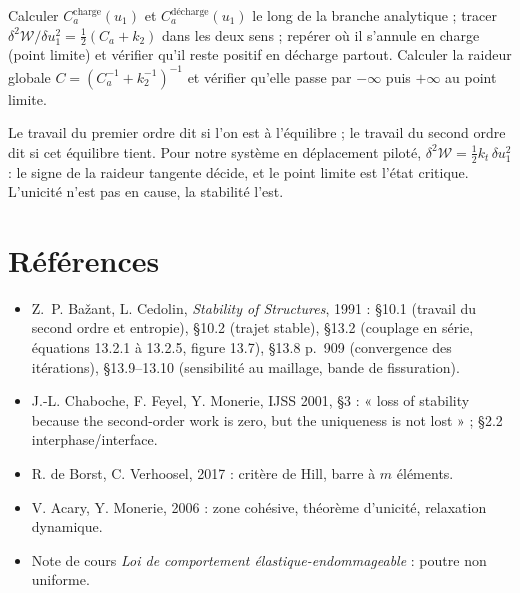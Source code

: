 \documentclass[11pt,a4paper]{article}
\newcommand{\dW}{\delta^2\mathcal W}
\begin{document}
\begin{alamain}
Calculer $C_a^{\text{charge}}(u_1)$ et $C_a^{\text{décharge}}(u_1)$ le long de la branche
analytique ; tracer $\dW/\delta u_1^2 = \tfrac12(C_a + k_2)$ dans les deux sens ; repérer où il
s'annule en charge (point limite) et vérifier qu'il reste positif en décharge partout.
Calculer la raideur globale $C = (C_a^{-1} + k_2^{-1})^{-1}$ et vérifier qu'elle passe par
$-\infty$ puis $+\infty$ au point limite.
\end{alamain}

\begin{idee}
Le travail du premier ordre dit si l'on est à l'équilibre ; le travail du second ordre dit si
cet équilibre tient. Pour notre système en déplacement piloté, $\dW = \tfrac12k_t\,\delta u_1^2$ :
le signe de la raideur tangente décide, et le point limite est l'état critique. L'unicité
n'est pas en cause, la stabilité l'est.
\end{idee}

\section*{Références}
\begin{itemize}[nosep]
  \item Z.~P. Bažant, L. Cedolin, \emph{Stability of Structures}, 1991 : §10.1 (travail du second
        ordre et entropie), §10.2 (trajet stable), §13.2 (couplage en série, équations 13.2.1 à
        13.2.5, figure 13.7), §13.8 p.~909 (convergence des itérations), §13.9--13.10 (sensibilité
        au maillage, bande de fissuration).
  \item J.-L. Chaboche, F. Feyel, Y. Monerie, IJSS 2001, §3 : « loss of stability because the
        second-order work is zero, but the uniqueness is not lost » ; §2.2 interphase/interface.
  \item R. de Borst, C. Verhoosel, 2017 : critère de Hill, barre à $m$ éléments.
  \item V. Acary, Y. Monerie, 2006 : zone cohésive, théorème d'unicité, relaxation dynamique.
  \item Note de cours \emph{Loi de comportement élastique-endommageable} : poutre non uniforme.
\end{itemize}
\end{document}
